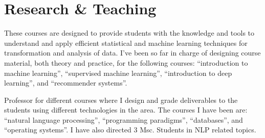 \documentclass[]{deedy-resume-openfont}
\begin{document}
\section{Research \& Teaching}

These courses are designed to provide students with the knowledge and tools 
to understand and apply efficient statistical and machine learning techniques
for transformation and analysis of data. I've been so far in charge of designing
course material, both theory and practice, for the following courses: 
``introduction to machine learning'', ``supervised machine learning'', 
``introduction to deep learning'', and ``recommender systems''.
\sectionsep

\newpage

Professor for different courses where I design and grade deliverables to the
students using different technologies in the area. The courses I have been
are: ``natural language processing'', ``programming paradigms'', ``databases'', 
and ``operating systems''. I have also directed 3 Msc. Students in NLP related topics.
\sectionsep
\end{document}

